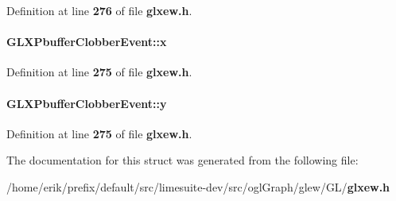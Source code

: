 Definition at line {\bf 276} of file {\bf glxew.\+h}.

\paragraph[{x}]{ G\+L\+X\+Pbuffer\+Clobber\+Event\+::x}\label{structGLXPbufferClobberEvent_a8f0a7162a033c89ee94ce535580dbc32}


Definition at line {\bf 275} of file {\bf glxew.\+h}.

\paragraph[{y}]{ G\+L\+X\+Pbuffer\+Clobber\+Event\+::y}\label{structGLXPbufferClobberEvent_a69eb7ac60d36ac3ec4550ac206cfc61f}


Definition at line {\bf 275} of file {\bf glxew.\+h}.



The documentation for this struct was generated from the following file\+:\begin{DoxyCompactItemize}
\item 
/home/erik/prefix/default/src/limesuite-\/dev/src/ogl\+Graph/glew/\+G\+L/{\bf glxew.\+h}\end{DoxyCompactItemize}
